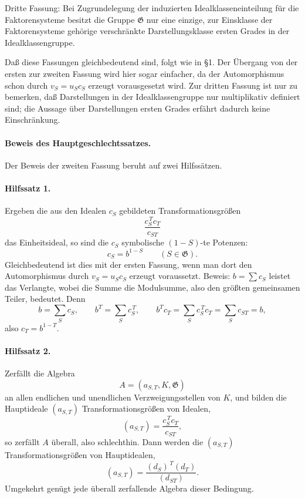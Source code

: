 \documentclass[11pt]{article}
\providecommand{\Gg}{\mathfrak G}
\begin{document}
Dritte Fassung: Bei Zugrundelegung der induzierten Idealklasseneinteilung für die Faktorensysteme besitzt die Gruppe \(\Gg\) nur eine einzige, zur Einsklasse der Faktorensysteme gehörige verschränkte Darstellungsklasse ersten Grades in der Idealklassengruppe.

Daß diese Fassungen gleichbedeutend sind, folgt wie in §1. Der Übergang von der ersten zur zweiten Fassung wird hier sogar einfacher, da der Automorphismus schon durch \(v_S=u_Sc_S\) erzeugt vorausgesetzt wird. Zur dritten Fassung ist nur zu bemerken, daß Darstellungen in der Idealklassengruppe nur multiplikativ definiert sind; die Aussage über Darstellungen ersten Grades erfährt dadurch keine Einschränkung.

\paragraph{Beweis des Hauptgeschlechtssatzes.}
Der Beweis der zweiten Fassung beruht auf zwei Hilfssätzen.

\paragraph{Hilfssatz 1.}
Ergeben die aus den Idealen \(c_S\) gebildeten Transformationsgrößen
\[
        \frac{c_S^{\,T}c_T}{c_{ST}}
\]
das Einheitsideal, so sind die \(c_S\) symbolische \((1-S)\)-te Potenzen:
\[
        c_S=b^{1-S}\qquad(S\in\Gg).
\]
Gleichbedeutend ist dies mit der ersten Fassung, wenn man dort den Automorphismus durch \(v_S=u_Sc_S\) erzeugt voraussetzt. Beweis: \(b=\sum c_S\) leistet das Verlangte, wobei die Summe die Modulsumme, also den größten gemeinsamen Teiler, bedeutet. Denn
\[
        b=\sum_S c_S,\qquad
        b^T=\sum_S c_S^{\,T},\qquad
        b^T c_T=\sum_S c_S^{\,T}c_T=\sum_S c_{ST}=b,
\]
also \(c_T=b^{1-T}\).

\paragraph{Hilfssatz 2.}
Zerfällt die Algebra
\[
        A=(a_{S,T},K,\Gg)
\]
an allen endlichen und unendlichen Verzweigungsstellen von \(K\), und bilden die Hauptideale \((a_{S,T})\) Transformationsgrößen von Idealen,
\[
        (a_{S,T})=\frac{c_S^{\,T}c_T}{c_{ST}},
\]
so zerfällt \(A\) überall, also schlechthin. Dann werden die \((a_{S,T})\) Transformationsgrößen von Hauptidealen,
\[
        (a_{S,T})=\frac{(d_S)^{\,T}(d_T)}{(d_{ST})}.
\]
Umgekehrt genügt jede überall zerfallende Algebra dieser Bedingung.
\end{document}
